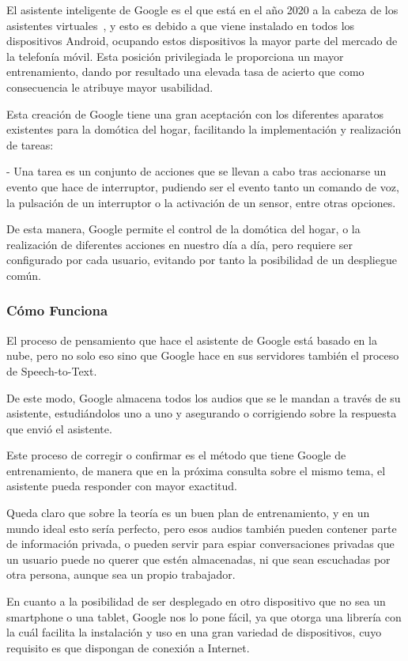 El asistente inteligente de Google es el que está en el año 2020 a la cabeza de los asistentes virtuales~\cite{top-asistentes}, y esto es debido a que viene instalado en todos los dispositivos Android, ocupando estos dispositivos la mayor parte del mercado de la telefonía móvil. Esta posición privilegiada le proporciona un mayor entrenamiento, dando por resultado una elevada tasa de acierto que como consecuencia le atribuye mayor usabilidad.

Esta creación de Google tiene una gran aceptación con los diferentes aparatos existentes para la domótica del hogar, facilitando la implementación y realización de tareas:

- Una tarea es un conjunto de acciones que se llevan a cabo tras accionarse un evento que hace de interruptor, pudiendo ser el evento tanto un comando de voz, la pulsación de un interruptor o la activación de un sensor, entre otras opciones.

De esta manera, Google permite el control de la domótica del hogar, o la realización de diferentes acciones en nuestro día a día, pero requiere ser configurado por cada usuario, evitando por tanto la posibilidad de un despliegue común.

\subsubsection{Cómo Funciona}

El proceso de pensamiento que hace el asistente de Google está basado en la nube, pero no solo eso sino que Google hace en sus servidores también el proceso de Speech-to-Text.

De este modo, Google almacena todos los audios\cite{google-almacena} que se le mandan a través de su asistente, estudiándolos uno a uno y asegurando o corrigiendo sobre la respuesta que envió el asistente.

Este proceso de corregir o confirmar es el método que tiene Google de entrenamiento, de manera que en la próxima consulta sobre el mismo tema, el asistente pueda responder con mayor exactitud.

Queda claro que sobre la teoría es un buen plan de entrenamiento, y en un mundo ideal esto sería perfecto, pero esos audios también pueden contener parte de información privada, o pueden servir para espiar conversaciones privadas que un usuario puede no querer que estén almacenadas, ni que sean escuchadas por otra persona, aunque sea un propio trabajador.

En cuanto a la posibilidad de ser desplegado en otro dispositivo que no sea un smartphone o una tablet, Google nos lo pone fácil, ya que otorga una librería con la cuál facilita la instalación y uso en una gran variedad de dispositivos, cuyo requisito es que dispongan de conexión a Internet.

